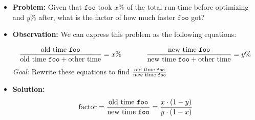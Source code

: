 \begin{frame}
    \frametitle{\problemtitle}
    \begin{itemize}
	    \item<+-> \textbf{Problem:} Given that $\texttt{foo}$ took $x \%$ of the total run time before optimizing and $y \%$ after, what is the factor of how much faster $\texttt{foo}$ got?
	    \item<+-> \textbf{Observation:} We can express this problem as the following equations:
		    
		    $$\frac{\text{old time \texttt{foo}}}{\text{old time \texttt{foo}} + \text{other time}} = x \% \hspace{35pt} \frac{\text{new time \texttt{foo}}}{\text{new time \texttt{foo}} + \text{other time}} = y \% $$
		    \textit{Goal:} Rewrite these equations to find $\frac{\text{old time \texttt{foo}}}{\text{new time \texttt{foo}}}$
	    \item<+-> \textbf{Solution:}
		    $$\text{factor} = \frac{\text{old time \texttt{foo}}}{\text{new time \texttt{foo}}} = \frac{x \cdot (1 - y)}{y \cdot (1 - x)}$$
    \end{itemize}
    \solvestats
\end{frame}
